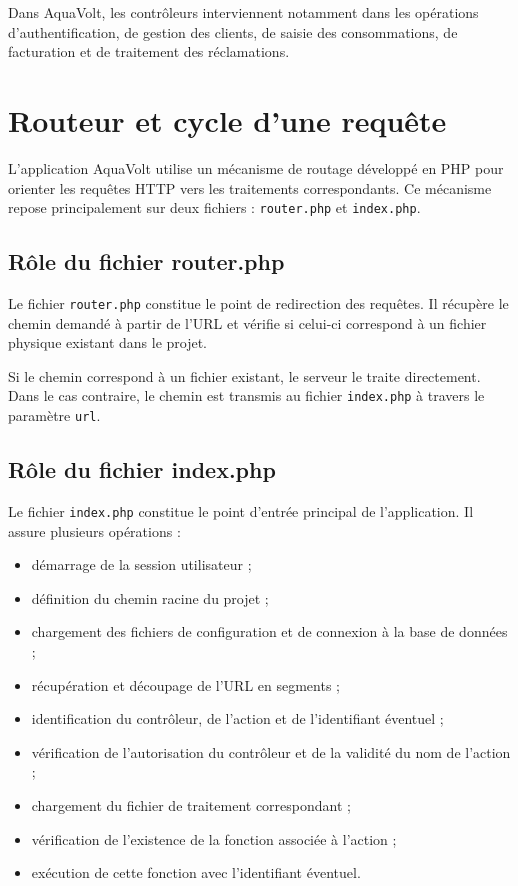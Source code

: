 Dans AquaVolt, les contrôleurs interviennent notamment dans les opérations d'authentification, de gestion des clients, de saisie des consommations, de facturation et de traitement des réclamations.


\section{Routeur et cycle d'une requête}

L'application AquaVolt utilise un mécanisme de routage développé en PHP pour orienter les requêtes HTTP vers les traitements correspondants. Ce mécanisme repose principalement sur deux fichiers : \texttt{router.php} et \texttt{index.php}.

\subsection*{Rôle du fichier router.php}

Le fichier \texttt{router.php} constitue le point de redirection des requêtes. Il récupère le chemin demandé à partir de l'URL et vérifie si celui-ci correspond à un fichier physique existant dans le projet.

Si le chemin correspond à un fichier existant, le serveur le traite directement. Dans le cas contraire, le chemin est transmis au fichier \texttt{index.php} à travers le paramètre \texttt{url}.

\subsection*{Rôle du fichier index.php}

Le fichier \texttt{index.php} constitue le point d'entrée principal de l'application. Il assure plusieurs opérations :

\begin{itemize}[leftmargin=*]
    \item démarrage de la session utilisateur ;
    \item définition du chemin racine du projet ;
    \item chargement des fichiers de configuration et de connexion à la base de données ;
    \item récupération et découpage de l'URL en segments ;
    \item identification du contrôleur, de l'action et de l'identifiant éventuel ;
    \item vérification de l'autorisation du contrôleur et de la validité du nom de l'action ;
    \item chargement du fichier de traitement correspondant ;
    \item vérification de l'existence de la fonction associée à l'action ;
    \item exécution de cette fonction avec l'identifiant éventuel.
\end{itemize}

